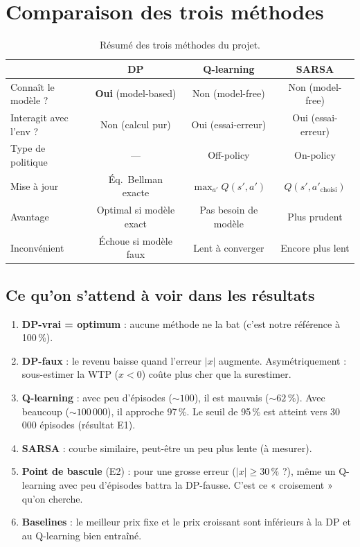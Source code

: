 \documentclass[11pt,a4paper]{article}
\begin{document}
\section{Comparaison des trois méthodes}
\label{sec:comparison}

\begin{table}[h]
\centering
\begin{tabular}{@{}lccc@{}}
\toprule
& \textbf{DP} & \textbf{Q-learning} & \textbf{SARSA} \\
\midrule
Connaît le modèle ? & \textbf{Oui} (model-based) & Non (model-free) & Non (model-free) \\
Interagit avec l'env ? & Non (calcul pur) & Oui (essai-erreur) & Oui (essai-erreur) \\
Type de politique & — & Off-policy & On-policy \\
Mise à jour & Éq.~Bellman exacte & $\max_{a'} Q(s',a')$ & $Q(s',a'_\text{choisi})$ \\
Avantage & Optimal si modèle exact & Pas besoin de modèle & Plus prudent \\
Inconvénient & Échoue si modèle faux & Lent à converger & Encore plus lent \\
\bottomrule
\end{tabular}
\caption{Résumé des trois méthodes du projet.}
\end{table}

\subsection{Ce qu'on s'attend à voir dans les résultats}

\begin{enumerate}[nosep]
  \item \textbf{DP-vrai = optimum} : aucune méthode ne la bat (c'est notre référence à 100\,\%).
  \item \textbf{DP-faux} : le revenu baisse quand l'erreur $|x|$ augmente. Asymétriquement : sous-estimer la WTP ($x < 0$) coûte plus cher que la surestimer.
  \item \textbf{Q-learning} : avec peu d'épisodes ($\sim 100$), il est mauvais ($\sim 62\,\%$). Avec beaucoup ($\sim 100\,000$), il approche 97\,\%. Le seuil de 95\,\% est atteint vers 30\,000 épisodes (résultat E1).
  \item \textbf{SARSA} : courbe similaire, peut-être un peu plus lente (à mesurer).
  \item \textbf{Point de bascule} (E2) : pour une grosse erreur ($|x| \geq 30\,\%$ ?), même un Q-learning avec peu d'épisodes battra la DP-fausse. C'est ce « croisement » qu'on cherche.
  \item \textbf{Baselines} : le meilleur prix fixe et le prix croissant sont inférieurs à la DP et au Q-learning bien entraîné.
\end{enumerate}
\end{document}
